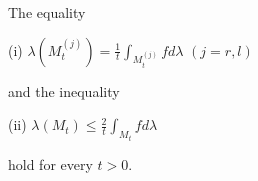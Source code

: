 The equality

(i) $\lambda(M_t^{(j)}) = \frac{1}{t} \int_{M_t^{(j)}} f d\lambda$ $(j = r, l)$

and the inequality

(ii) $\lambda(M_t) \leq \frac{2}{t} \int_{M_t} f d\lambda$

hold for every $t > 0$.